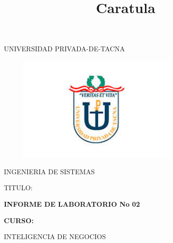 \documentclass[12pt,letterpaper]{article}
\begin{document}
%


\title{Caratula}

\begin{titlepage}
\begin{center}
\large{UNIVERSIDAD PRIVADA-DE-TACNA}\\
\vspace*{-0.025in}
\begin{figure}[htb]
\begin{center}
\includegraphics[width=8cm]{./Imagenes/logo}
\end{center}
\end{figure}
\vspace*{0.15in}
INGENIERIA DE SISTEMAS  \\

\vspace*{0.5in}
\begin{large}
TITULO:\\
\end{large}

\vspace*{0.1in}
\begin{Large}
\textbf{INFORME DE LABORATORIO No 02} \\
\end{Large}

\vspace*{0.3in}
\begin{Large}
\textbf{CURSO:} \\
\end{Large}

\vspace*{0.1in}
\begin{large}
INTELIGENCIA DE NEGOCIOS\\
\end{large}


\end{center}
\end{titlepage}
\end{document}
